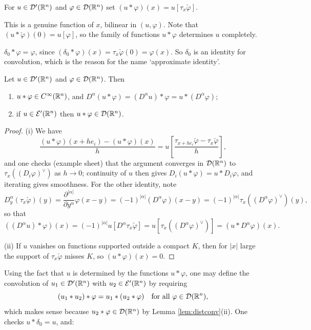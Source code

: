 \documentclass[a4paper]{scrartcl}
\newcommand{\Ecal}{\mathcal{E}}
\begin{document}
\begin{definition}
	For $u \in \mathcal{D}'(\mathbb{R}^n)$ and $\varphi\in\mathcal{D}(\mathbb{R}^n)$ set $(u*\varphi)(x)=u[\tau_x\check\varphi]$.
\end{definition}

This is a genuine function of $x$, bilinear in $(u,\varphi)$. Note that $(u*\check\varphi)(0)=u[\varphi]$, so the family of functions $u * \varphi$ determines $u$ completely.

\begin{example}
	$\delta_0 * \varphi = \varphi$, since $(\delta_0*\varphi)(x)=\tau_x\check\varphi(0)=\varphi(x)$. So $\delta_0$ is an identity for convolution, which is the reason for the name `approximate identity'.
\end{example}

\begin{lemma}\label{lem:distconv}
	Let $u \in \mathcal{D}'(\mathbb{R}^n)$ and $\varphi\in\mathcal{D}(\mathbb{R}^n)$. Then
	\begin{enumerate}[label=(\roman*)]
		\item $u * \varphi\in C^\infty(\mathbb{R}^n)$, and $D^\alpha(u*\varphi)=(D^\alpha u)*\varphi=u*(D^\alpha\varphi)$;
		\item if $u \in \Ecal'(\R^n)$ then $u*\varphi\in\mathcal{D}(\mathbb{R}^n)$.
	\end{enumerate}
\end{lemma}

\begin{proof}
	(i) We have
	$$\frac{(u*\varphi)(x+he_i)-(u*\varphi)(x)}{h}=u\!\left[\frac{\tau_{x+he_i}\check\varphi-\tau_x\check\varphi}{h}\right],$$
	and one checks (example sheet) that the argument converges in $\mathcal{D}(\mathbb{R}^n)$ to $\tau_x((D_i\varphi)^\vee)$ as $h \to 0$; continuity of $u$ then gives $D_i(u*\varphi)=u*D_i\varphi$, and iterating gives smoothness. For the other identity, note
	$$D^\alpha_y\left(\tau_x\check\varphi\right)(y)=\frac{\partial^{|\alpha|}}{\partial y^\alpha}\varphi(x-y)=(-1)^{|\alpha|}(D^\alpha\varphi)(x-y)=(-1)^{|\alpha|}\tau_x((D^\alpha\varphi)^\vee)(y),$$
	so that
	$$((D^\alpha u)*\varphi)(x)=(-1)^{|\alpha|}u[D^\alpha\tau_x\check\varphi]=u[\tau_x((D^\alpha\varphi)^\vee)]=(u*D^\alpha\varphi)(x).$$

	(ii) If $u$ vanishes on functions supported outside a compact $K$, then for $|x|$ large the support of $\tau_x\check\varphi$ misses $K$, so $(u*\varphi)(x)=0$.
\end{proof}

Using the fact that $u$ is determined by the functions $u*\varphi$, one may define the convolution of $u_1\in\mathcal{D}'(\mathbb{R}^n)$ with $u_2\in\Ecal'(\R^n)$ by requiring
$$(u_1*u_2)*\varphi = u_1*(u_2*\varphi) \quad\text{for all }\varphi\in\mathcal{D}(\mathbb{R}^n),$$
which makes sense because $u_2 * \varphi \in \mathcal{D}(\mathbb{R}^n)$ by Lemma \ref{lem:distconv}(ii). One checks $u * \delta_0 = u$, and:
\end{document}
